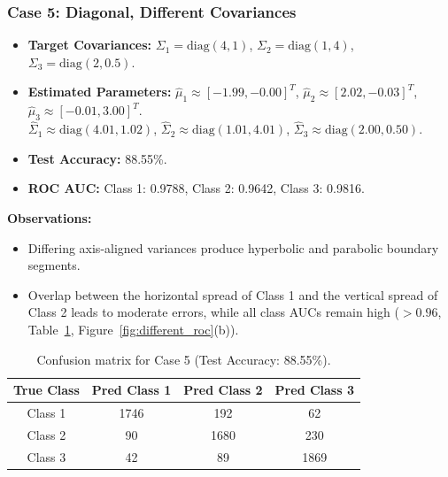 \documentclass[11pt,a4paper]{article}
\begin{document}
\subsubsection{Case 5: Diagonal, Different Covariances}
\begin{itemize}
  \item \textbf{Target Covariances:} $\Sigma_1=\mathrm{diag}(4,1)$, $\Sigma_2=\mathrm{diag}(1,4)$, $\Sigma_3=\mathrm{diag}(2,0.5)$.
  \item \textbf{Estimated Parameters:} $\hat{\mu}_1\approx[-1.99,-0.00]^T$, $\hat{\mu}_2\approx[2.02,-0.03]^T$, $\hat{\mu}_3\approx[-0.01,3.00]^T$.\\
  $\hat{\Sigma}_1\approx\mathrm{diag}(4.01,1.02)$, $\hat{\Sigma}_2\approx\mathrm{diag}(1.01,4.01)$, $\hat{\Sigma}_3\approx\mathrm{diag}(2.00,0.50)$.
  \item \textbf{Test Accuracy:} 88.55\%.
  \item \textbf{ROC AUC:} Class 1: 0.9788, Class 2: 0.9642, Class 3: 0.9816.
\end{itemize}
\textbf{Observations:}
\begin{itemize}
  \item Differing axis-aligned variances produce hyperbolic and parabolic boundary segments.
  \item Overlap between the horizontal spread of Class 1 and the vertical spread of Class 2 leads to moderate errors, while all class AUCs remain high ($>0.96$, Table~\ref{tab:c5}, Figure~\ref{fig:different_roc}(b)).
\end{itemize}

\begin{table}[ht]
\centering
\begin{tabular}{cccc}
\toprule
\textbf{True Class} & \textbf{Pred Class 1} & \textbf{Pred Class 2} & \textbf{Pred Class 3}\\
\midrule
Class 1 & 1746 & 192 & 62\\
Class 2 & 90 & 1680 & 230\\
Class 3 & 42 & 89 & 1869\\
\bottomrule
\end{tabular}
\caption{Confusion matrix for Case 5 (Test Accuracy: 88.55\%).}
\label{tab:c5}
\end{table}
\end{document}

